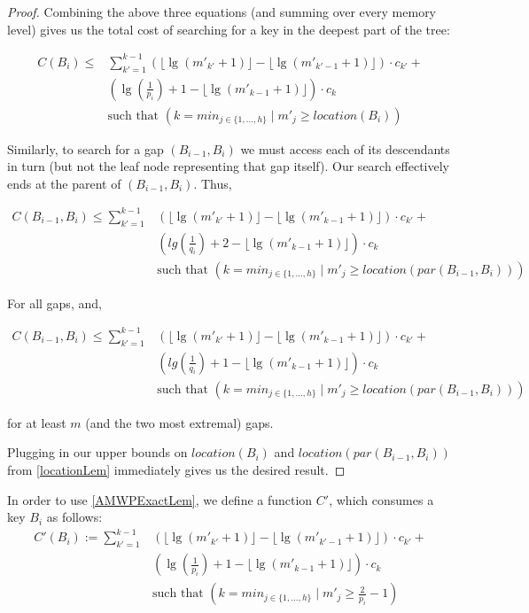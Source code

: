 \documentclass[letterpaper,12pt,titlepage,oneside,final]{book}
\theoremstyle{plain}
\begin{document}
\begin{proof}
Combining the above three equations (and summing over every memory level) gives us the total cost of searching for a key in the deepest part of the tree:

\begin{align*}
C(B_i) \leq &\sum_{k'=1}^{k-1} \left(\lfloor \lg(m'_{k'}+1) \rfloor - \lfloor \lg(m'_{k'-1}+1) \rfloor \right)\cdot c_{k'}+ \\
 &\left(\lg(\frac{1}{p_i}) + 1 - \lfloor \lg(m'_{k-1}+1) \rfloor \right)\cdot c_k \\
&\text{such that } \left( k=min_{j \in \{1, ..., h\}} \mid m'_j \geq location(B_i) \right)
\end{align*}

Similarly, to search for a gap $(B_{i-1},B_i)$ we must access each of its descendants in turn (but not the leaf node representing that gap itself). Our search effectively ends at the parent of $(B_{i-1},B_i)$. Thus, 

\begin{align*}
C(B_{i-1},B_i) \leq \sum_{k'=1}^{k-1} &\left(\lfloor \lg(m'_{k'}+1) \rfloor - \lfloor \lg(m'_{k-1}+1) \rfloor \right)\cdot c_{k'}+ \\
 &\left(lg(\frac{1}{q_i}) + 2 - \lfloor \lg(m'_{k-1}+1) \rfloor \right)\cdot c_k \\
&\text{such that } \left( k=min_{j \in \{1, ..., h\}} \mid m'_j \geq location(par(B_{i-1},B_i)) \right)
\end{align*}

For all gaps, and,  

\begin{align*}
C(B_{i-1},B_i) \leq \sum_{k'=1}^{k-1} &\left(\lfloor \lg(m'_{k'}+1) \rfloor - \lfloor \lg(m'_{k-1}+1) \rfloor \right)\cdot c_{k'}+ \\
&\left(lg(\frac{1}{q_i}) + 1 - \lfloor \lg(m'_{k-1}+1) \rfloor \right)\cdot c_k \\
&\text{such that } \left( k=min_{j \in \{1, ..., h\}} \mid m'_j \geq location(par(B_{i-1},B_i)) \right)
\end{align*}

for at least $m$ (and the two most extremal) gaps.

Plugging in our upper bounds on $location(B_i)$ and $location(par(B_{i-1},B_i))$ from \ref{locationLem} immediately gives us the desired result.

\end{proof}

In order to use \ref{AMWPExactLem}, we define a function $C'$, which consumes a key $B_i$ as follows:
\begin{align*}
C'(B_i) :=  \sum_{k'=1}^{k-1} &\left(\lfloor \lg(m'_{k'}+1) \rfloor - \lfloor \lg(m'_{k'-1}+1) \rfloor \right)\cdot c_{k'}+ \\
 &\left(\lg(\frac{1}{p_i}) + 1 - \lfloor \lg(m'_{k-1}+1) \rfloor \right)\cdot c_k\\
&\text{such that } \left( k=min_{j \in \{1, ..., h\}} \mid m'_j \geq \frac{2}{p_i}-1 \right) 
\end{align*}
\end{document}
